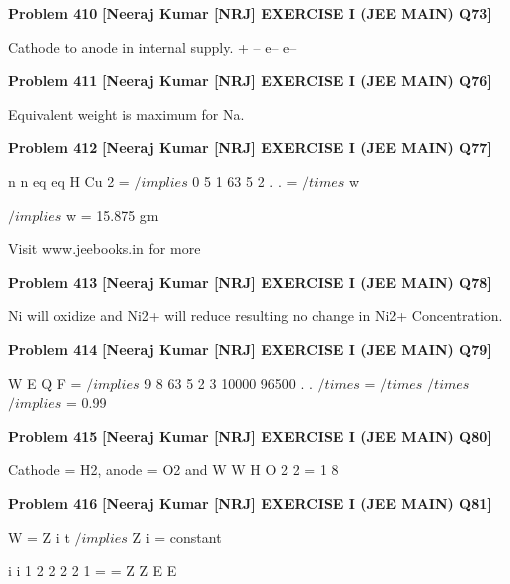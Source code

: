 \begin{problembox}
\textbf{Problem 410} \hfill \textbf{[Neeraj Kumar [NRJ] EXERCISE I (JEE MAIN) Q73]}
\label{q:ext-nrj_all_questions-410}

Cathode to anode in internal supply.
+
-- e--
e--
\end{problembox}

\begin{problembox}
\textbf{Problem 411} \hfill \textbf{[Neeraj Kumar [NRJ] EXERCISE I (JEE MAIN) Q76]}
\label{q:ext-nrj_all_questions-411}

Equivalent weight is maximum for Na.
\end{problembox}

\begin{problembox}
\textbf{Problem 412} \hfill \textbf{[Neeraj Kumar [NRJ] EXERCISE I (JEE MAIN) Q77]}
\label{q:ext-nrj_all_questions-412}

n
n
eq
eq
H
Cu
2 =
 $/implies$ 0 5
1
63 5
2
.
.
=
$/times$
w
 
 
 $/implies$ w = 15.875 gm
 
 
Visit www.jeebooks.in for more
\end{problembox}

\begin{problembox}
\textbf{Problem 413} \hfill \textbf{[Neeraj Kumar [NRJ] EXERCISE I (JEE MAIN) Q78]}
\label{q:ext-nrj_all_questions-413}

Ni will oxidize and Ni2+ will reduce resulting no 
change in Ni2+ Concentration.
\end{problembox}

\begin{problembox}
\textbf{Problem 414} \hfill \textbf{[Neeraj Kumar [NRJ] EXERCISE I (JEE MAIN) Q79]}
\label{q:ext-nrj_all_questions-414}

W
E
Q
F
=
 $/implies$ 9 8
63 5
2
3 10000
96500
.
. $/times$
=
$/times$
$/times$  $/implies$   = 0.99
\end{problembox}

\begin{problembox}
\textbf{Problem 415} \hfill \textbf{[Neeraj Kumar [NRJ] EXERCISE I (JEE MAIN) Q80]}
\label{q:ext-nrj_all_questions-415}

Cathode = H2, anode = O2 and 
W
W
H
O
2
2
= 1
8
\end{problembox}

\begin{problembox}
\textbf{Problem 416} \hfill \textbf{[Neeraj Kumar [NRJ] EXERCISE I (JEE MAIN) Q81]}
\label{q:ext-nrj_all_questions-416}

W = Z   i   t $/implies$ Z   i = constant
 
   
i
i
1
2
2
2
2
1
=
=
Z
Z
E
E
\end{problembox}

